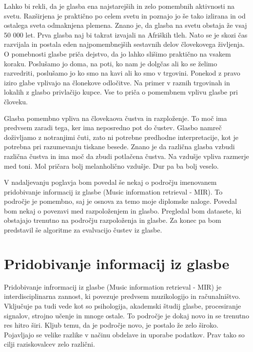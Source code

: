 \documentclass[a4paper, 12pt]{book}
\begin{document}
{Lahko bi rekli, da je glasba ena najstarejših in zelo pomembnih aktivnosti na svetu. Razširjena je praktično po celem svetu in poznajo jo še tako izlirana in od ostalega sveta odmaknjena plemena. Znano je, da glasba na svetu obstaja že vsaj 50 000 let. Prva glasba naj bi takrat izvajali na Afriških tleh. Nato se je skozi čas razvijala in postala eden najpomembnejših sestavnih delov človekovega življenja. \cite{wallin2001origins} \cite{krause2012great} O pomebnosti glasbe priča dejstvo, da jo lahko slišimo praktično na vsakem koraku. Poslušamo jo doma, na poti, ko nam je dolgčas ali ko se želimo razvedriti, poslušamo jo ko smo na kavi ali ko smo v trgovini. Ponekod z pravo iziro glabe vplivajo na člonekove odločitve. Na primer v raznih trgovinah in lokalih z glasbo privlačijo kupce. Vse to priča o pomembnem vplivu glasbe pri človeku.  

Glasba pomembno vpliva na človekaova čustva in razploženje. To moč ima predvsem zaradi tega, ker ima neposredno pot do čustev. Glasbo namreč doživljamo z notranjimi čuti, zato ni potrebne predhodne interpretacije, kot je potrebna pri razumevanju tiskane besede.  Znano je da različna glasba vzbudi različna čustva in ima moč da zbudi potlačena čustva. Na vzdušje vpliva razmerje med toni. Mol pričara bolj melanholično vzdušje. Dur pa ba bolj veselo. \cite{lenko2009pomen}

V nadaljevanju poglavja bom povedal še nekaj o področju imenovanem pridobivanje informacij iz glasbe (Music information retrieval - MIR). To področje je pomembno, saj je osnova za temo moje diplomske naloge. Povedal bom nekaj o povezavi med razpoloženjem in glasbo. Pregledal bom datasete, ki obstajajo trenutno na področju razpoloženja in glasbe. Za konec pa bom predstavil še algoritme za evalvacijo čustev iz glasbe. 

\section{Pridobivanje informacij iz glasbe}

Pridobivanje infrormacij iz glasbe (Music information retrieval - MIR) je interdisciplinarna zannost, ki povezuje predvsem muzikologijo in računalništvo. \cite{pesek2012prepoznavanje} Vključuje pa tudi vede kot so psihologija, akademski študij glasbe, procesiranje signalov, strojno učenje in mnoge ostale. To področje je dokaj novo in se trenutno res hitro širi. Kljub temu, da je področje novo, je postalo že zelo široko. Pojavljajo se velike razlike v načinu obdelave in uporabe podatkov. Prav tako so cilji raziskovalcev zelo različni.

}
\end{document}
